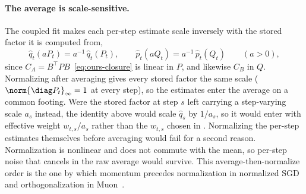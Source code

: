 \paragraph{The average is scale-sensitive.} The coupled fit makes each
per-step estimate scale inversely with the stored factor it is computed
from,
\[
  \hat{q}_t(aP_t)=a^{-1}\,\hat{q}_t(P_t),
  \qquad
  \hat{p}_t(aQ_t)=a^{-1}\,\hat{p}_t(Q_t)
  \qquad(a>0),
\]
since $C_A=B^\top PB$~\eqref{eq:ours-closure} is linear in $P$, and
likewise $C_B$ in $Q$. Normalizing after
averaging gives every stored factor the same scale
($\norm{\diag P_t}_\infty=1$ at every step), so the estimates enter the
average on a common footing. Were the stored factor at step $s$ left carrying a step-varying scale
$a_s$ instead, the identity above would scale
$\hat{q}_s$ by $1/a_s$, so it would enter with effective weight
$w_{t,s}/a_s$ rather than the $w_{t,s}$ chosen in .
Normalizing the per-step estimates themselves before averaging would fail
for a second reason. Normalization is nonlinear and does not commute with
the mean, so per-step noise that cancels in the raw average would survive.
This average-then-normalize order is the one by which momentum precedes
normalization in normalized SGD~\cite{cutkosky_nigt} and orthogonalization
in Muon~\cite{denoise_ortho}.


